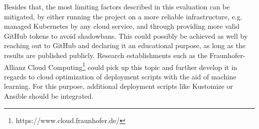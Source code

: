 Besides that, the most limiting factors described in this evaluation can be mitigated, by either running the project on a more reliable infrastructure, e.g. managed Kubernetes by any cloud service, and through providing more valid GitHub tokens to avoid shadowbans. This could possibly be achieved as well by reaching out to GitHub and declaring it an educational purpose, as long as the results are published publicly.
Research establishments such as the Fraunhofer-Allianz Cloud Computing\footnote{https://www.cloud.fraunhofer.de/} could pick up this topic and further develop it in regards to cloud optimization of deployment scripts with the aid of machine learning. For this purpose, additional deployment scripts like Kustomize or Ansible should be integrated.




